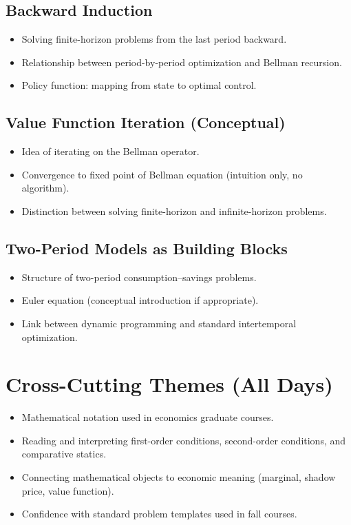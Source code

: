\documentclass[11pt,a4paper]{article}
\begin{document}
\subsection{Backward Induction}
\begin{itemize}[leftmargin=*]
    \item Solving finite-horizon problems from the last period backward.
    \item Relationship between period-by-period optimization and Bellman recursion.
    \item Policy function: mapping from state to optimal control.
\end{itemize}

\subsection{Value Function Iteration (Conceptual)}
\begin{itemize}[leftmargin=*]
    \item Idea of iterating on the Bellman operator.
    \item Convergence to fixed point of Bellman equation (intuition only, no algorithm).
    \item Distinction between solving finite-horizon and infinite-horizon problems.
\end{itemize}

\subsection{Two-Period Models as Building Blocks}
\begin{itemize}[leftmargin=*]
    \item Structure of two-period consumption--savings problems.
    \item Euler equation (conceptual introduction if appropriate).
    \item Link between dynamic programming and standard intertemporal optimization.
\end{itemize}

\section{Cross-Cutting Themes (All Days)}

\begin{itemize}[leftmargin=*]
    \item Mathematical notation used in economics graduate courses.
    \item Reading and interpreting first-order conditions, second-order conditions, and comparative statics.
    \item Connecting mathematical objects to economic meaning (marginal, shadow price, value function).
    \item Confidence with standard problem templates used in fall courses.
\end{itemize}
\end{document}
